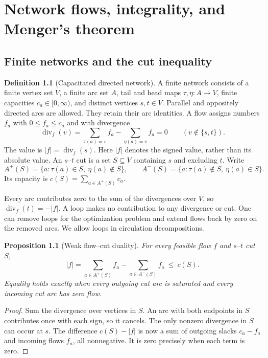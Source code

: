 \documentclass[11pt,oneside,openany]{book}
\theoremstyle{plain}
\newtheorem{proposition}[theorem]{Proposition}
\theoremstyle{definition}
\newtheorem{definition}[theorem]{Definition}
\theoremstyle{remark}
\begin{document}
\chapter{Network flows, integrality, and Menger's theorem}
\label{p204:ch07}

\section{Finite networks and the cut inequality}

\begin{definition}[Capacitated directed network]\label{p204:W44}
A finite network consists of a finite vertex set \(V\), a finite arc
set \(A\), tail and head maps \(\tau,\eta:A\to V\), finite capacities
\(c_a\in[0,\infty)\), and distinct vertices \(s,t\in V\).
Parallel and oppositely directed arcs are allowed. They retain their
arc identities. A flow assigns numbers \(f_a\) with \(0\leq f_a\leq c_a\)
and with divergence
\[
  \operatorname{div}_f(v)
     = \sum_{\tau(a)=v} f_a-\sum_{\eta(a)=v}f_a
     =0 \qquad (v\notin\{s,t\}).
\]
The value is \(|f|=\operatorname{div}_f(s)\). Here \(|f|\) denotes the
signed value, rather than its absolute value. An \(s\)--\(t\) cut is a
set \(S\subseteq V\) containing \(s\) and excluding \(t\). Write
\[
 A^+(S)=\{a:\tau(a)\in S,\ \eta(a)\notin S\},\qquad
 A^-(S)=\{a:\tau(a)\notin S,\ \eta(a)\in S\}.
\]
Its capacity is \(c(S)=\sum_{a\in A^+(S)}c_a\).
\end{definition}

Every arc contributes zero to the sum of the divergences over \(V\),
so \(\operatorname{div}_f(t)=-|f|\). A loop makes no contribution to any
divergence or cut. One can remove loops for the optimization problem
and extend flows back by zero on the removed arcs. We allow loops in
circulation decompositions.

\begin{proposition}[Weak flow--cut duality]\label{p204:W45}
For every feasible flow \(f\) and \(s\)--\(t\) cut \(S\),
\[
 |f|=\sum_{a\in A^+(S)}f_a-\sum_{a\in A^-(S)}f_a\ \leq\ c(S).
\]
Equality holds exactly when every outgoing cut arc is saturated
and every incoming cut arc has zero flow.
\end{proposition}

\begin{proof}
Sum the divergence over vertices in \(S\). An arc with both endpoints
in \(S\) contributes once with each sign, so it cancels. The only
nonzero divergence in \(S\) can occur at \(s\). The difference
\(c(S)-|f|\) is now a sum of outgoing slacks \(c_a-f_a\) and incoming
flows \(f_a\), all nonnegative. It is zero precisely when each term
is zero.
\end{proof}
\end{document}
